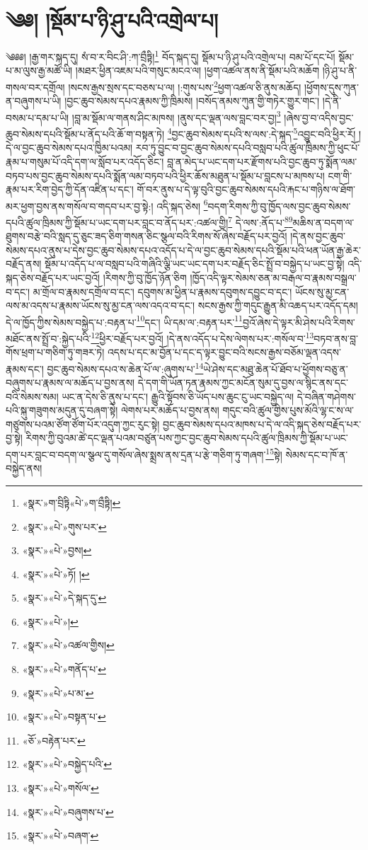 \chapter{༄༅། །སྡོམ་པ་ཉི་ཤུ་པའི་འགྲེལ་པ།}༄༅༅། །རྒྱ་གར་སྐད་དུ། སཾ་བ་ར་བིང་ཤི་:ཀ་བྲྀཏྟི།\footnote{«སྣར་»ག་བྲིཏྟི«པེ་»ག་བྲྀཏྟི།} བོད་སྐད་དུ། སྡོམ་པ་ཉི་ཤུ་པའི་འགྲེལ་པ། བམ་པོ་དང་པོ། སྡོམ་པ་མ་ལུས་རྒྱ་མཚོ་ཡི། །མཐར་ཕྱིན་འཇམ་པའི་གསུང་མངའ་ལ། །ཕྱག་འཚལ་ནས་ནི་སྡོམ་པའི་མཆོག །ཉི་ཤུ་པ་ནི་གསལ་བར་དགྲོལ། །སངས་རྒྱས་སྲས་དང་བཅས་པ་ལ། །:གུས་པས་\footnote{«སྣར་»«པེ་»གུས་པར་}ཕྱག་འཚལ་ཅི་ནུས་མཆོད། །ཕྱོགས་དུས་ཀུན་ན་བཞུགས་པ་ཡི། །བྱང་ཆུབ་སེམས་དཔའ་རྣམས་ཀྱི་ཁྲིམས། །བསོད་ནམས་ཀུན་གྱི་གཏེར་གྱུར་གང་། །དེ་ནི་བསམ་པ་དམ་པ་ཡི། །བླ་མ་སྡོམ་ལ་གནས་ཤིང་མཁས། །ནུས་དང་ལྡན་ལས་བླང་བར་བྱ།\footnote{«སྣར་»«པེ་»བྱས།} །ཞེས་བྱ་བ་འདིས་བྱང་ཆུབ་སེམས་དཔའི་སྡོམ་པ་ནོད་པའི་ཆོ་ག་བསྟན་ཏེ། \footnote{«སྣར་»«པེ་»ཏོ། ། }བྱང་ཆུབ་སེམས་དཔའི་ས་ལས་:དེ་སྐད་\footnote{«སྣར་»«པེ་»དེ་སྐད་དུ་}འབྱུང་བའི་ཕྱིར་རོ། །དེ་ལ་བྱང་ཆུབ་སེམས་དཔའ་ཁྱིམ་པའམ། རབ་ཏུ་བྱུང་བ་བྱང་ཆུབ་སེམས་དཔའི་བསླབ་པའི་ཚུལ་ཁྲིམས་ཀྱི་ཕུང་པོ་རྣམ་པ་གསུམ་པོ་འདི་དག་ལ་སློབ་པར་འདོད་ཅིང་། བླ་ན་མེད་པ་ཡང་དག་པར་རྫོགས་པའི་བྱང་ཆུབ་ཏུ་སྨོན་ལམ་བཏབ་པས་བྱང་ཆུབ་སེམས་དཔའི་སྨོན་ལམ་བཏབ་པའི་ཕྱིར་ཆོས་མཐུན་པ་སྡོམ་པ་བླངས་པ་མཁས་པ། ངག་གི་རྣམ་པར་རིག་བྱེད་ཀྱི་དོན་འཛིན་པ་དང་། གོ་བར་ནུས་པ་དེ་ལྟ་བུའི་བྱང་ཆུབ་སེམས་དཔའི་རྐང་པ་གཉིས་ལ་ཐོག་མར་ཕྱག་བྱས་ནས་གསོལ་བ་གདབ་པར་བྱ་སྟེ:། འདི་སྐད་ཅེས། \footnote{«སྣར་»«པེ་»།  }བདག་རིགས་ཀྱི་བུ་ཁྱོད་ལས་བྱང་ཆུབ་སེམས་དཔའི་ཚུལ་ཁྲིམས་ཀྱི་སྡོམ་པ་ཡང་དག་པར་བླང་བ་ནོད་པར་:འཚལ་གྱི།\footnote{«སྣར་»«པེ་»འཚལ་གྱིས།} དེ་ལས་:ནོད་པ་\footnote{«སྣར་»«པེ་»གནོད་པ་}\footnote{«སྣར་»«པེ་»པ་མ་}མཆིས་ན་བདག་ལ་ཐུགས་བརྩེ་བའི་སླད་དུ་ཅུང་ཟད་ཅིག་གསན་ཅིང་སྩལ་བའི་རིགས་སོ་ཞེས་བརྗོད་པར་བྱའོ། །དེ་ནས་བྱང་ཆུབ་སེམས་དཔའ་ནུས་པ་དེས་བྱང་ཆུབ་སེམས་དཔའ་འདོད་པ་དེ་ལ་བྱང་ཆུབ་སེམས་དཔའི་སྡོམ་པའི་ཕན་ཡོན་རྒྱ་ཆེར་བརྗོད་ནས། སྡོམ་པ་འདོད་པ་ལ་བསླབ་པའི་གཞིའི་ལྕི་ཡང་ཡང་དག་པར་བརྗོད་ཅིང་སྤྲོ་བ་བསྐྱེད་པ་ཡང་བྱ་སྟེ། འདི་སྐད་ཅེས་བརྗོད་པར་ཡང་བྱའོ། །རིགས་ཀྱི་བུ་ཁྱོད་ཉོན་ཅིག །ཁྱོད་འདི་ལྟར་སེམས་ཅན་མ་བརྒལ་བ་རྣམས་བསྒྲལ་བ་དང་། མ་གྲོལ་བ་རྣམས་དགྲོལ་བ་དང་། དབུགས་མ་ཕྱིན་པ་རྣམས་དབུགས་དབྱུང་བ་དང་། ཡོངས་སུ་མྱ་ངན་ལས་མ་འདས་པ་རྣམས་ཡོངས་སུ་མྱ་ངན་ལས་འདའ་བ་དང་། སངས་རྒྱས་ཀྱི་གདུང་རྒྱུན་མི་འཆད་པར་འདོད་དམ། དེ་ལ་ཁྱོད་ཀྱིས་སེམས་བསྐྱེད་པ་:བརྟན་པ་\footnote{«སྣར་»«པེ་»བསྟན་པ་}དང་། ཡི་དམ་ལ་:བརྟན་པར་\footnote{«ཅོ་»བརྟེན་པར་}བྱའོ་ཞེས་དེ་ལྟར་མི་ཤེས་པའི་རིགས་མཐོང་ནས་སྤྲོ་བ་:སྐྱེད་པའི་\footnote{«སྣར་»«པེ་»བསྐྱེད་པའི་}ཕྱིར་བརྗོད་པར་བྱའོ། །དེ་ནས་འདོད་པ་དེས་ལེགས་པར་:གསོལ་བ་\footnote{«སྣར་»«པེ་»གསོལ་}བཏབ་ནས་བླ་གོས་ཕྲག་པ་གཅིག་ཏུ་གཟར་ཏེ། འདས་པ་དང་མ་བྱོན་པ་དང་ད་ལྟར་བྱུང་བའི་སངས་རྒྱས་བཅོམ་ལྡན་འདས་རྣམས་དང་། བྱང་ཆུབ་སེམས་དཔའ་ས་ཆེན་པོ་ལ་:ཞུགས་པ་\footnote{«སྣར་»«པེ་»བཞུགས་པ་}ཡེ་ཤེས་དང་མཐུ་ཆེན་པོ་ཐོབ་པ་ཕྱོགས་བཅུ་ན་བཞུགས་པ་རྣམས་ལ་མཆོད་པ་བྱས་ནས། དེ་དག་གི་ཡོན་ཏན་རྣམས་ཀྱང་མངོན་སུམ་དུ་བྱས་ལ་སྙིང་ནས་དང་བའི་སེམས་སམ། ཡང་ན་དེས་ཅི་ནུས་པ་དང་། རྒྱུའི་སྟོབས་ཅི་ཡོད་པས་ཆུང་ངུ་ཡང་བསྐྱེད་ལ། དེ་བཞིན་གཤེགས་པའི་སྐུ་གཟུགས་མདུན་དུ་བཞག་སྟེ། ལེགས་པར་མཆོད་པ་བྱས་ནས། གདུང་བའི་ཚུལ་གྱིས་པུས་མོའི་ལྷ་ང་ས་ལ་གཙུགས་པའམ་ཙོག་ཙོག་པོར་འདུག་ཀྱང་རུང་སྟེ། བྱང་ཆུབ་སེམས་དཔའ་མཁས་པ་དེ་ལ་འདི་སྐད་ཅེས་བརྗོད་པར་བྱ་སྟེ། རིགས་ཀྱི་བུའམ་ཚེ་དང་ལྡན་པའམ་བཙུན་པས་ཀྱང་བྱང་ཆུབ་སེམས་དཔའི་ཚུལ་ཁྲིམས་ཀྱི་སྡོམ་པ་ཡང་དག་པར་བླང་བ་བདག་ལ་སྩལ་དུ་གསོལ་ཞེས་སྨྲས་ནས་དྲན་པ་རྩེ་གཅིག་ཏུ་གཞག་\footnote{«སྣར་»«པེ་»བཞག་}སྟེ། སེམས་དང་བ་ཁོ་ན་བསྐྱེད་ནས། 